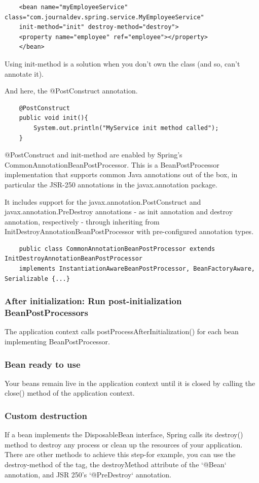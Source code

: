 \documentclass{scrartcl}
\begin{document}
\begin{lstlisting}
    <bean name="myEmployeeService" class="com.journaldev.spring.service.MyEmployeeService"
    init-method="init" destroy-method="destroy">
    <property name="employee" ref="employee"></property>
    </bean>
\end{lstlisting}

Using init-method is a solution when you don't own the class (and so, can't annotate it).

And here, the @PostConstruct annotation.

\begin{lstlisting}
    @PostConstruct
    public void init(){
        System.out.println("MyService init method called");
    }
\end{lstlisting}

@PostConstruct and init-method are enabled by Spring's  CommonAnnotationBeanPostProcessor. This is a
BeanPostProcessor implementation that supports common Java annotations out of the box, in particular the JSR-250 annotations in the javax.annotation package.

It includes support for the javax.annotation.PostConstruct and javax.annotation.PreDestroy annotations - as init annotation and destroy annotation, respectively - through inheriting from InitDestroyAnnotationBeanPostProcessor with pre-configured annotation types.

\begin{lstlisting}
    public class CommonAnnotationBeanPostProcessor extends InitDestroyAnnotationBeanPostProcessor
    implements InstantiationAwareBeanPostProcessor, BeanFactoryAware, Serializable {...}

\end{lstlisting}

\subsubsection{After initialization: Run post-initialization BeanPostProcessors}
The application context calls postProcessAfterInitialization() for each bean implementing BeanPostProcessor.

\subsubsection{Bean ready to use}
Your beans remain live in the application context until it is closed by calling the close() method of the application context.

\subsubsection{Custom destruction}
If a bean implements the DisposableBean interface, Spring calls its destroy() method to destroy any process or clean up the resources of your application. There are other methods to achieve this step-for example, you can use the destroy-method of the tag, the destroyMethod attribute of the `@Bean` annotation, and JSR 250's `@PreDestroy` annotation.
\end{document}
